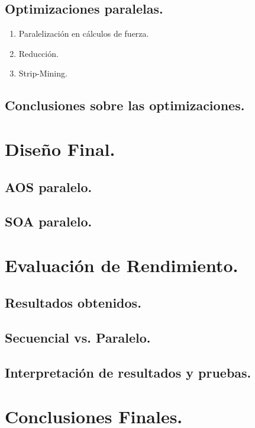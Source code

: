 \documentclass{article}
\begin{document}
\subsection{Optimizaciones paralelas.\label{opt_parallel}}
\begin{enumerate}
\item Paralelización en cálculos de fuerza.
\item Reducción.
\item Strip-Mining.
\end{enumerate}
\subsection{Conclusiones sobre las optimizaciones.}

\section{Diseño Final.\label{final}}
\subsection{AOS paralelo.}
\subsection{SOA paralelo.}

\section{Evaluación de Rendimiento.\label{performance}}
\subsection{Resultados obtenidos.}
\subsection{Secuencial vs. Paralelo.}
\subsection{Interpretación de resultados y pruebas.}

\section{Conclusiones Finales.\label{conclusiones}}
\end{document}
